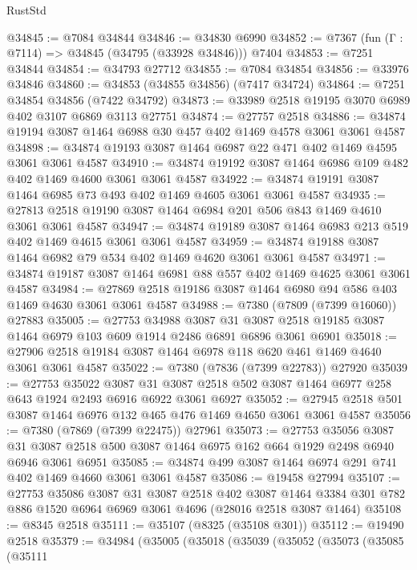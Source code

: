 \begin{lexlean}{RustStd}
\begin{coremodule}
@34845 := @7084 @34844
@34846 := @34830 @6990
@34852 := @7367 (fun (Γ : @7114) => @34845 (@34795 (@33928 @34846))) @7404
@34853 := @7251 @34844
@34854 := @34793 @27712
@34855 := @7084 @34854
@34856 := @33976 @34846
@34860 := @34853 (@34855 @34856) (@7417 @34724)
@34864 := @7251 @34854 @34856 (@7422 @34792)
@34873 := @33989 @2518 @19195 @3070 @6989 @402 @3107 @6869 @3113 @27751
@34874 := @27757 @2518
@34886 := @34874 @19194 @3087 @1464 @6988 @30 @457 @402 @1469 @4578 @3061 @3061 @4587
@34898 := @34874 @19193 @3087 @1464 @6987 @22 @471 @402 @1469 @4595 @3061 @3061 @4587
@34910 := @34874 @19192 @3087 @1464 @6986 @109 @482 @402 @1469 @4600 @3061 @3061 @4587
@34922 := @34874 @19191 @3087 @1464 @6985 @73 @493 @402 @1469 @4605 @3061 @3061 @4587
@34935 := @27813 @2518 @19190 @3087 @1464 @6984 @201 @506 @843 @1469 @4610 @3061 @3061 @4587
@34947 := @34874 @19189 @3087 @1464 @6983 @213 @519 @402 @1469 @4615 @3061 @3061 @4587
@34959 := @34874 @19188 @3087 @1464 @6982 @79 @534 @402 @1469 @4620 @3061 @3061 @4587
@34971 := @34874 @19187 @3087 @1464 @6981 @88 @557 @402 @1469 @4625 @3061 @3061 @4587
@34984 := @27869 @2518 @19186 @3087 @1464 @6980 @94 @586 @403 @1469 @4630 @3061 @3061 @4587
@34988 := @7380 (@7809 (@7399 @16060)) @27883
@35005 := @27753
    @34988
    @3087
    @31
    @3087
    @2518
    @19185
    @3087
    @1464
    @6979
    @103
    @609
    @1914
    @2486
    @6891
    @6896
    @3061
    @6901
@35018 := @27906 @2518 @19184 @3087 @1464 @6978 @118 @620 @461 @1469 @4640 @3061 @3061 @4587
@35022 := @7380 (@7836 (@7399 @22783)) @27920
@35039 := @27753
    @35022
    @3087
    @31
    @3087
    @2518
    @502
    @3087
    @1464
    @6977
    @258
    @643
    @1924
    @2493
    @6916
    @6922
    @3061
    @6927
@35052 := @27945 @2518 @501 @3087 @1464 @6976 @132 @465 @476 @1469 @4650 @3061 @3061 @4587
@35056 := @7380 (@7869 (@7399 @22475)) @27961
@35073 := @27753
    @35056
    @3087
    @31
    @3087
    @2518
    @500
    @3087
    @1464
    @6975
    @162
    @664
    @1929
    @2498
    @6940
    @6946
    @3061
    @6951
@35085 := @34874 @499 @3087 @1464 @6974 @291 @741 @402 @1469 @4660 @3061 @3061 @4587
@35086 := @19458 @27994
@35107 := @27753
    @35086
    @3087
    @31
    @3087
    @2518
    @402
    @3087
    @1464
    @3384
    @301
    @782
    @886
    @1520
    @6964
    @6969
    @3061
    @4696
    (@28016 @2518 @3087 @1464)
@35108 := @8345 @2518
@35111 := @35107 (@8325 (@35108 @301))
@35112 := @19490 @2518
@35379 := @34984
    (@35005
      (@35018
        (@35039
          (@35052
            (@35073
              (@35085
                (@35111

\end{coremodule}
\end{lexlean}
